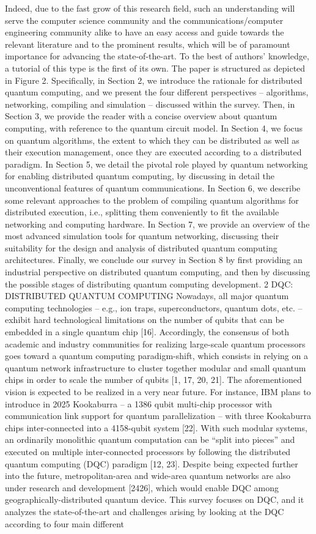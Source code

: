 Indeed, due to the fast grow of this research field, such an understanding will serve the computer science community and the communications/computer engineering community alike to have an easy access and guide towards the relevant literature and to the prominent results, which will be of paramount importance for advancing the state-of-the-art. To the best of authors’ knowledge, a tutorial of this type is the first of its own. The paper is structured as depicted in Figure 2. Specifically, in Section 2, we introduce the rationale for distributed quantum computing, and we present the four different perspectives – algorithms, networking, compiling and simulation – discussed within the survey. Then, in Section 3, we provide the reader with a concise overview about quantum computing, with reference to the quantum circuit model. In Section 4, we focus on quantum algorithms, the extent to which they can be distributed as well as their execution management, once they are executed according to a distributed paradigm. In Section 5, we detail the pivotal role played by quantum networking for enabling distributed quantum computing, by discussing in detail the unconventional features of quantum communications. In Section 6, we describe some relevant approaches to the problem of compiling quantum algorithms for distributed execution, i.e., splitting them conveniently to fit the available networking and computing hardware. In Section 7, we provide an overview of the most advanced simulation tools for quantum networking, discussing their suitability for the design and analysis of distributed quantum computing architectures. Finally, we conclude our survey in Section 8 by first providing an industrial perspective on distributed quantum computing, and then by discussing the possible stages of distributing quantum computing development. 2 DQC: DISTRIBUTED QUANTUM COMPUTING Nowadays, all major quantum computing technologies – e.g., ion traps, superconductors, quantum dots, etc. – exhibit hard technological limitations on the number of qubits that can be embedded in a single quantum chip [16]. Accordingly, the consensus of both academic and industry communities for realizing large-scale quantum processors goes toward a quantum computing paradigm-shift, which consists in relying on a quantum network infrastructure to cluster together modular and small quantum chips in order to scale the number of qubits [1, 17, 20, 21]. The aforementioned vision is expected to be realized in a very near future. For instance, IBM plans to introduce in 2025 Kookaburra – a 1386 qubit multi-chip processor with communication link support for quantum parallelization – with three Kookaburra chips inter-connected into a 4158-qubit system [22]. With such modular systems, an ordinarily monolithic quantum computation can be “split into pieces” and executed on multiple inter-connected processors by following the distributed quantum computing (DQC) paradigm [12, 23]. Despite being expected further into the future, metropolitan-area and wide-area quantum networks are also under research and development [2426], which would enable DQC among geographically-distributed quantum device. This survey focuses on DQC, and it analyzes the state-of-the-art and challenges arising by looking at the DQC according to four main different 